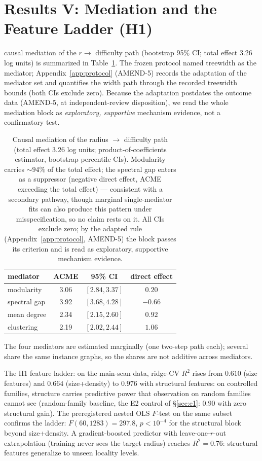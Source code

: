 \documentclass[manuscript, screen, review]{jair}
\begin{document}
\section{Results V: Mediation and the Feature Ladder (H1)}
\label{sec:mediation}

\citet{imai2011} causal mediation of the $r \to$ difficulty path (bootstrap
95\% CI; total effect 3.26 log units) is summarized in
Table~\ref{tab:mediation}. The frozen protocol named treewidth as the
mediator; Appendix~\ref{app:protocol} (AMEND-5) records the adaptation of
the mediator set and quantifies the width path through the recorded
treewidth bounds (both CIs exclude zero). Because the adaptation postdates
the outcome data (AMEND-5, at independent-review disposition), we read the
whole mediation block as \emph{exploratory, supportive} mechanism evidence,
not a confirmatory test.

\begin{table}[h]
\centering
\caption{Causal mediation of the radius $\to$ difficulty path (total effect
$3.26$ log units; product-of-coefficients estimator, bootstrap percentile
CIs). Modularity carries ${\sim}94\%$ of the total effect; the spectral gap
enters as a suppressor (negative direct effect, ACME exceeding the total
effect) --- consistent with a secondary pathway, though marginal
single-mediator fits can also produce this pattern under misspecification,
so no claim rests on it. All CIs exclude zero; by the adapted rule
(Appendix~\ref{app:protocol}, AMEND-5) the block passes its criterion and is
read as exploratory, supportive mechanism evidence.}
\begin{tabular}{lccc}
\toprule
mediator & ACME & 95\% CI & direct effect\\
\midrule
modularity & 3.06 & $[2.84, 3.37]$ & $0.20$\\
spectral gap & 3.92 & $[3.68, 4.28]$ & $-0.66$\\
mean degree & 2.34 & $[2.15, 2.60]$ & $0.92$\\
clustering & 2.19 & $[2.02, 2.44]$ & $1.06$\\
\bottomrule
\end{tabular}

\label{tab:mediation}
\end{table}

The four mediators are estimated marginally (one two-step path each); several
share the same instance graphs, so the shares are not additive across
mediators.

The H1 feature ladder: on the main-scan data, ridge-CV $R^2$ rises from
$0.610$ (size features) and $0.664$ (size+density) to $\mathbf{0.976}$ with
structural features: on controlled families, structure carries predictive
power that observation on random families cannot see (random-family baseline, the E2 control of \S\ref{sec:e1}:
$0.90$ with zero structural gain). The preregistered nested OLS
$F$-test on the same subset confirms the ladder: $F(60,1283)=297.8$,
$p<10^{-4}$ for the structural block beyond size+density. A
gradient-boosted predictor with leave-one-$r$-out extrapolation (training
never sees the target radius) reaches $R^2 = 0.76$: structural features
generalize to unseen locality levels.
\end{document}
